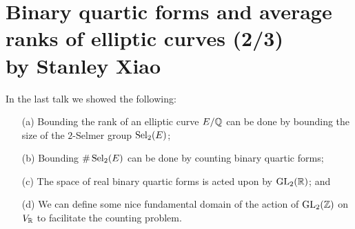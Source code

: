 \documentclass[12pt,amsfont]{amsart}
\begin{document}
\newpage
\section{Binary quartic forms and average ranks of elliptic curves (2/3) \\ by Stanley Xiao}

In the last talk we showed the following:
\begin{itemize}
\item[(a)] Bounding the rank of an elliptic curve $E/{\mathbb Q}$ can be done by bounding the size of the $2$-Selmer group $\operatorname{Sel}_2(E)$; 
\item[(b)] Bounding $\# \operatorname{Sel}_2(E)$ can be done by counting binary quartic forms; 
\item[(c)] The space of real binary quartic forms is acted upon by $\operatorname{GL}_2({\mathbb R})$; and
\item[(d)] We can define some nice fundamental domain of the action of $\operatorname{GL}_2({\mathbb Z})$ on $V_{\mathbb R}$ to facilitate the counting problem. 
\end{itemize}
\end{document}

